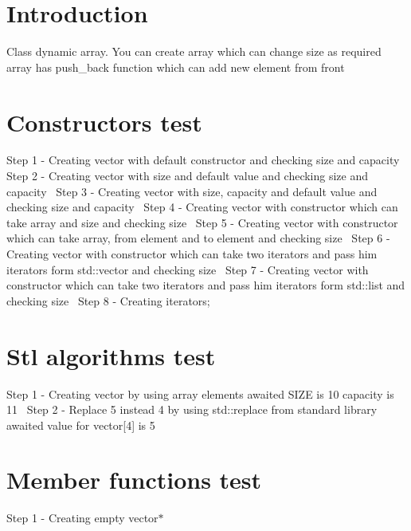 \hypertarget{index_Introduction}{}\section{Introduction}\label{index_Introduction}
Class dynamic array. You can create array which can change size as required array has push\+\_\+back function which can add new element from front\hypertarget{index_test_1}{}\section{Constructors test}\label{index_test_1}
Step 1 -\/ Creating vector with default constructor and checking size and capacity~\newline
Step 2 -\/ Creating vector with size and default value and checking size and capacity~\newline
Step 3 -\/ Creating vector with size, capacity and default value and checking size and capacity~\newline
Step 4 -\/ Creating vector with constructor which can take array and size and checking size~\newline
Step 5 -\/ Creating vector with constructor which can take array, from element and to element and checking size~\newline
Step 6 -\/ Creating vector with constructor which can take two iterators and pass him iterators form std\+::vector and checking size~\newline
Step 7 -\/ Creating vector with constructor which can take two iterators and pass him iterators form std\+::list and checking size~\newline
Step 8 -\/ Creating iterators;\hypertarget{index_test_2}{}\section{Stl algorithms test}\label{index_test_2}
Step 1 -\/ Creating vector by using array elements awaited S\+I\+ZE is 10 capacity is 11~\newline
Step 2 -\/ Replace 5 instead 4 by using std\+::replace from standard library awaited value for vector\mbox{[}4\mbox{]} is 5~\newline
 \hypertarget{index_test_3}{}\section{Member functions test}\label{index_test_3}
Step 1 -\/ Creating empty vector$\ast$~\newline
